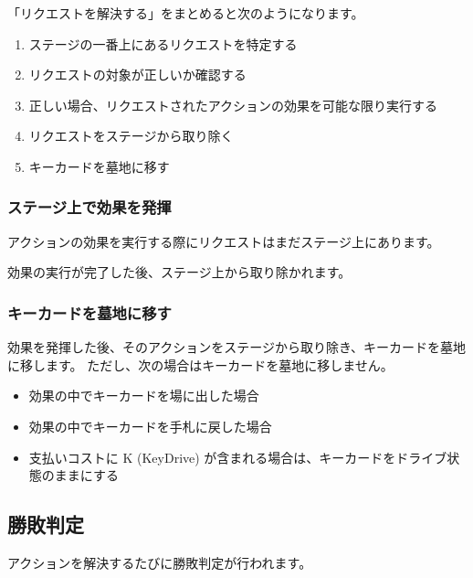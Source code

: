 \documentclass[letterpaper,10pt,dvipdfmx]{sphinxmanual}
\begin{document}
\sphinxAtStartPar
「リクエストを解決する」をまとめると次のようになります。
\begin{enumerate}
%
\item {} 
\sphinxAtStartPar
ステージの一番上にあるリクエストを特定する

\item {} 
\sphinxAtStartPar
リクエストの対象が正しいか確認する

\item {} 
\sphinxAtStartPar
正しい場合、リクエストされたアクションの効果を可能な限り実行する

\item {} 
\sphinxAtStartPar
リクエストをステージから取り除く

\item {} 
\sphinxAtStartPar
キーカードを墓地に移す

\end{enumerate}


\subsubsection{ステージ上で効果を発揮}
\label{\detokenize{common/common:id29}}
\sphinxAtStartPar
アクションの効果を実行する際にリクエストはまだステージ上にあります。

\sphinxAtStartPar
効果の実行が完了した後、ステージ上から取り除かれます。


\subsubsection{キーカードを墓地に移す}
\label{\detokenize{common/common:keycard-gy}}\label{\detokenize{common/common:id30}}
\sphinxAtStartPar
効果を発揮した後、そのアクションをステージから取り除き、キーカードを墓地に移します。
ただし、次の場合はキーカードを墓地に移しません。
\begin{itemize}
\item {} 
\sphinxAtStartPar
効果の中でキーカードを場に出した場合

\item {} 
\sphinxAtStartPar
効果の中でキーカードを手札に戻した場合

\item {} 
\sphinxAtStartPar
支払いコストに K (KeyDrive) が含まれる場合は、キーカードをドライブ状態のままにする

\end{itemize}


\subsection{勝敗判定}
\label{\detokenize{common/common:id31}}
\sphinxAtStartPar
アクションを解決するたびに勝敗判定が行われます。
\end{document}
